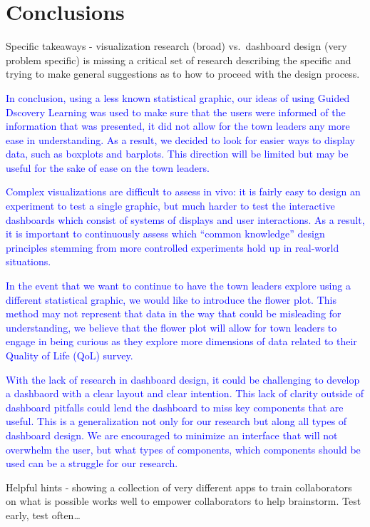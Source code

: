 \documentclass[letterpaper,inpress]{jdsart}
\begin{document}
\section {Conclusions}

Specific takeaways - visualization research (broad) vs.~dashboard design (very problem specific) is missing a critical set of research describing the specific and trying to make general suggestions as to how to proceed with the design process.

{\textcolor{blue}{In conclusion, using a less known statistical graphic, our ideas of using Guided Dscovery Learning was used to make sure that the users were informed of the information that was presented, it did not allow for the town leaders any more ease in understanding. As a result, we decided to look for easier ways to display data, such as boxplots and barplots. This direction will be limited but may be useful for the sake of ease on the town leaders.}}

{\textcolor{blue}{Complex visualizations are difficult to assess in vivo: it is fairly easy to design an experiment to test a single graphic, but much harder to test the interactive dashboards which consist of systems of displays and user interactions. As a result, it is important to continuously assess which ``common knowledge'' design principles stemming from more controlled experiments hold up in real-world situations.}}

{\textcolor{blue}{In the event that we want to continue to have the town leaders explore using a different statistical graphic, we would like to introduce the flower plot. This method may not represent that data in the way that could be misleading for understanding, we believe that the flower plot will allow for town leaders to engage in being curious as they explore more dimensions of data related to their Quality of Life (QoL) survey.}}

{\textcolor{blue}{With the lack of research in dashboard design, it could be challenging to develop a dashbaord with a clear layout and clear intention. This lack of clarity outside of dashboard pitfalls could lend the dashboard to miss key components that are useful. This is a generalization not only for our research but along all types of dashboard design. We are encouraged to minimize an interface that will not overwhelm the user, but what types of components, which components should be used can be a struggle for our research.}}

Helpful hints - showing a collection of very different apps to train collaborators on what is possible works well to empower collaborators to help brainstorm.
Test early, test often\ldots{}
\end{document}
